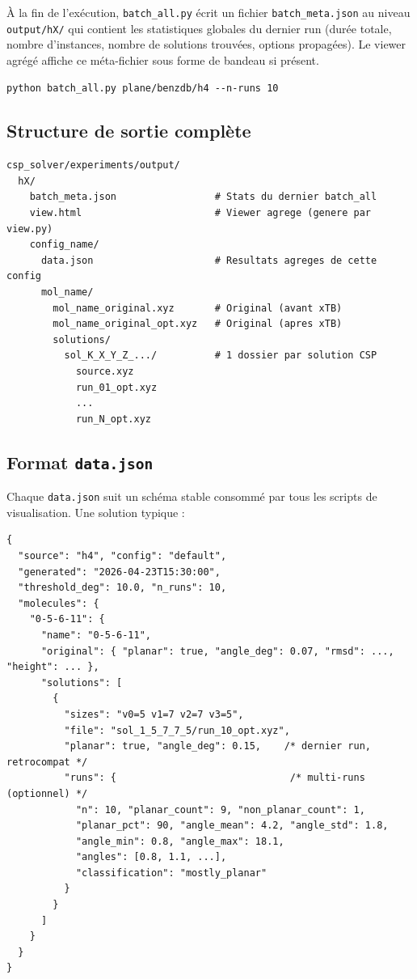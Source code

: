\documentclass[12pt,a4paper]{article}
\theoremstyle{definition}
\begin{document}
À la fin de l'exécution, \texttt{batch\_all.py} écrit un fichier \texttt{batch\_meta.json}
au niveau \texttt{output/hX/} qui contient les statistiques globales du dernier run (durée
totale, nombre d'instances, nombre de solutions trouvées, options propagées). Le viewer
agrégé affiche ce méta-fichier sous forme de bandeau si présent.

\begin{lstlisting}[style=benzai]
python batch_all.py plane/benzdb/h4 --n-runs 10
\end{lstlisting}

\subsection{Structure de sortie complète}

\begin{lstlisting}[style=benzai]
csp_solver/experiments/output/
  hX/
    batch_meta.json                 # Stats du dernier batch_all
    view.html                       # Viewer agrege (genere par view.py)
    config_name/
      data.json                     # Resultats agreges de cette config
      mol_name/
        mol_name_original.xyz       # Original (avant xTB)
        mol_name_original_opt.xyz   # Original (apres xTB)
        solutions/
          sol_K_X_Y_Z_.../          # 1 dossier par solution CSP
            source.xyz
            run_01_opt.xyz
            ...
            run_N_opt.xyz
\end{lstlisting}

\subsection{Format \texttt{data.json}}

Chaque \texttt{data.json} suit un schéma stable consommé par tous les scripts de
visualisation. Une solution typique :

\begin{lstlisting}[style=benzai]
{
  "source": "h4", "config": "default",
  "generated": "2026-04-23T15:30:00",
  "threshold_deg": 10.0, "n_runs": 10,
  "molecules": {
    "0-5-6-11": {
      "name": "0-5-6-11",
      "original": { "planar": true, "angle_deg": 0.07, "rmsd": ..., "height": ... },
      "solutions": [
        {
          "sizes": "v0=5 v1=7 v2=7 v3=5",
          "file": "sol_1_5_7_7_5/run_10_opt.xyz",
          "planar": true, "angle_deg": 0.15,    /* dernier run, retrocompat */
          "runs": {                              /* multi-runs (optionnel) */
            "n": 10, "planar_count": 9, "non_planar_count": 1,
            "planar_pct": 90, "angle_mean": 4.2, "angle_std": 1.8,
            "angle_min": 0.8, "angle_max": 18.1,
            "angles": [0.8, 1.1, ...],
            "classification": "mostly_planar"
          }
        }
      ]
    }
  }
}
\end{lstlisting}
\end{document}
